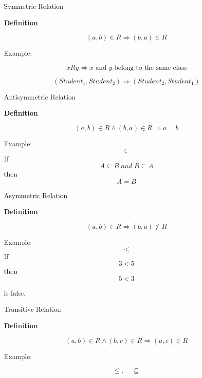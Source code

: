
\begin{frame}{Symmetric Relation}

\textbf{Definition}

\[
(a,b)\in R
\Longrightarrow
(b,a)\in R
\]

\vspace{0.5cm}

Example:

\[
xRy
\iff
x
\text{ and }
y
\text{ belong to the same class}
\]

\[
(Student_1,Student_2)
\Longrightarrow
(Student_2,Student_1)
\]

\end{frame}


\begin{frame}{Antisymmetric Relation}

\textbf{Definition}

\[
(a,b)\in R
\land
(b,a)\in R
\Longrightarrow
a=b
\]

\vspace{0.5cm}

Example:
\[
\subseteq
\]
If
\[
A\subseteq B
\; and\;
B\subseteq A
\]
then
\[
A=B
\]

\end{frame}


\begin{frame}{Asymmetric Relation}

\textbf{Definition}

\[
(a,b)\in R
\Longrightarrow
(b,a)\notin R
\]

\vspace{0.4cm}

Example:
\[
<
\]
If
\[
3<5
\]
then
\[
5<3
\]

is false.

\end{frame}


\begin{frame}{Transitive Relation}

\textbf{Definition}

\[
(a,b)\in R
\land
(b,c)\in R
\Longrightarrow
(a,c)\in R
\]

\vspace{0.5cm}

Example:

\[
\le,\quad \subseteq
\]

\end{frame}

